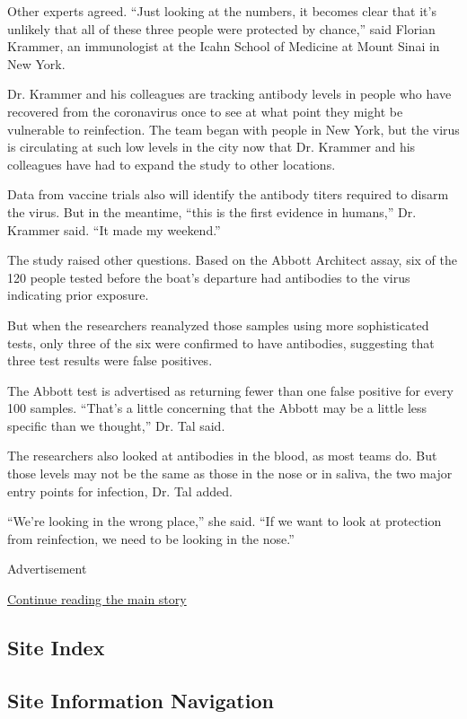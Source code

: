 Other experts agreed. ``Just looking at the numbers, it becomes clear
that it's unlikely that all of these three people were protected by
chance,'' said Florian Krammer, an immunologist at the Icahn School of
Medicine at Mount Sinai in New York.

Dr. Krammer and his colleagues are tracking antibody levels in people
who have recovered from the coronavirus once to see at what point they
might be vulnerable to reinfection. The team began with people in New
York, but the virus is circulating at such low levels in the city now
that Dr. Krammer and his colleagues have had to expand the study to
other locations.

Data from vaccine trials also will identify the antibody titers required
to disarm the virus. But in the meantime, ``this is the first evidence
in humans,'' Dr. Krammer said. ``It made my weekend.''

The study raised other questions. Based on the Abbott Architect assay,
six of the 120 people tested before the boat's departure had antibodies
to the virus indicating prior exposure.

But when the researchers reanalyzed those samples using more
sophisticated tests, only three of the six were confirmed to have
antibodies, suggesting that three test results were false positives.

The Abbott test is advertised as returning fewer than one false positive
for every 100 samples. ``That's a little concerning that the Abbott may
be a little less specific than we thought,'' Dr. Tal said.

The researchers also looked at antibodies in the blood, as most teams
do. But those levels may not be the same as those in the nose or in
saliva, the two major entry points for infection, Dr. Tal added.

``We're looking in the wrong place,'' she said. ``If we want to look at
protection from reinfection, we need to be looking in the nose.''

Advertisement

\protect\hyperlink{after-bottom}{Continue reading the main story}

\hypertarget{site-index}{%
\subsection{Site Index}\label{site-index}}

\hypertarget{site-information-navigation}{%
\subsection{Site Information
Navigation}\label{site-information-navigation}}

